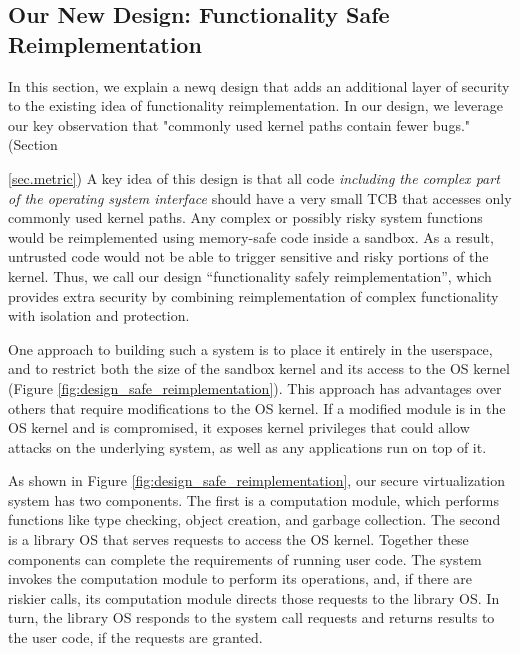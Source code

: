 \subsection {Our New Design: Functionality Safe Reimplementation}
In this section, we explain a newq design that adds an additional layer of security to
the existing idea of functionality reimplementation.
In our design, we leverage our key observation
 that "commonly used kernel paths contain fewer bugs."
(Section {\ref{sec.metric})
A key idea of this design is that all code \emph{including the complex part
of the operating system interface} should have a very small TCB that accesses only
commonly used kernel paths.
Any complex or possibly risky system functions
would be reimplemented using memory-safe code inside a sandbox.
As a result, untrusted code would not be able to
trigger sensitive and risky portions of the kernel.
Thus, we call our design ``functionality safely reimplementation'',
which provides extra security by combining reimplementation of
complex functionality with isolation and protection.

One approach to building such a system is to place it entirely in the userspace,
and to restrict both the size of the sandbox kernel and its access to the
OS kernel (Figure \ref{fig:design_safe_reimplementation}).
This approach has advantages over others that require modifications to
the OS kernel.
If a modified module is in the OS kernel and is compromised, it exposes
kernel privileges that could allow attacks
on the underlying system, as well as any applications run on top of it.

As shown in Figure \ref{fig:design_safe_reimplementation}, our secure virtualization system
has two components.
The first is a computation module, which performs functions like type checking,
object creation, and garbage collection. 
The second is a library OS that
serves requests to access the OS kernel.
Together these components can complete the requirements of running user code.
The system invokes the computation module to perform its operations,
and, if there are riskier calls, its computation module directs those requests to the
library OS. In turn, the library OS responds to the system call requests and
returns results to the user code, if the requests are granted. 


}
